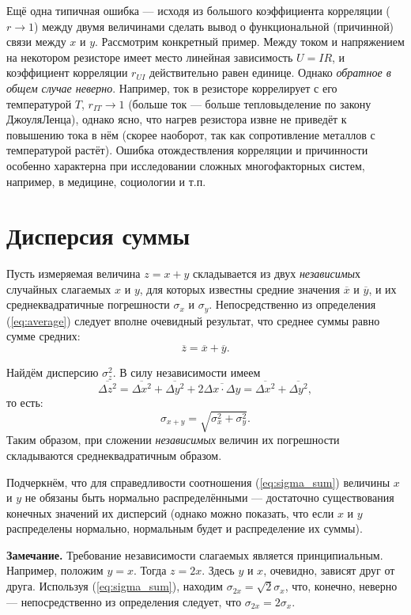 {\small{}Ещё одна типичная ошибка --- исходя из большого
коэффициента корреляции ($r\to1$) между двумя величинами сделать
вывод о функциональной (причинной) связи между $x$ и $y$. Рассмотрим
конкретный пример. Между током и напряжением на некотором резисторе
имеет место линейная зависимость $U=IR$, и коэффициент корреляции
$r_{UI}$ действительно равен единице. Однако }\emph{\small{}обратное
в общем случае неверно}{\small{}. Например, ток в резисторе коррелирует
с его температурой $T$, $r_{IT}\to1$ (больше ток --- больше
тепловыделение по закону Джоуля\textendash Ленца), однако ясно, что
нагрев резистора извне не приведёт к повышению тока в нём (скорее
наоборот, так как сопротивление металлов с температурой растёт). Ошибка
отождествления корреляции и причинности особенно характерна при исследовании
сложных многофакторных систем, например, в медицине, социологии и
т.п.}{\small\par}

\section{Дисперсия суммы}

Пусть измеряемая величина $z=x+y$ складывается из двух \emph{независимы}х
случайных слагаемых $x$ и $y$, для которых известны средние значения
$\overline{x}$ и $\overline{y}$, и их среднеквадратичные погрешности
$\sigma_{x}$ и $\sigma_{y}$. Непосредственно из определения (\ref{eq:average})
следует вполне очевидный результат, что среднее суммы равно сумме
средних: 
\[
\overline{z}=\overline{x}+\overline{y}.
\]

Найдём дисперсию $\sigma_{z}^{2}$. В силу независимости имеем
\[
\overline{\Delta z^{2}}=\overline{\Delta x^{2}}+\overline{\Delta y^{2}}+2\overline{\Delta x\cdot\Delta y}=\overline{\Delta x^{2}}+\overline{\Delta y^{2}},
\]
то есть:
\begin{equation}
\boxed{{\sigma_{x+y}=\sqrt{\sigma_{x}^{2}+\sigma_{y}^{2}}}}.\label{eq:sigma_sum}
\end{equation}
Таким образом, при сложении \emph{независимых }величин их погрешности
складываются среднеквадратичным образом.

Подчеркнём, что для справедливости соотношения (\ref{eq:sigma_sum})
величины $x$ и $y$ не обязаны быть нормально распределёнными ---
достаточно существования конечных значений их дисперсий (однако можно
показать, что если $x$ и $y$ распределены нормально, нормальным
будет и распределение их суммы).

\small{
\textbf{Замечание.} Требование независимости
слагаемых является принципиальным. Например, положим $y=x$. Тогда
$z=2x$. Здесь $y$ и $x$, очевидно, зависят друг от друга. Используя
(\ref{eq:sigma_sum}), находим $\sigma_{2x}=\sqrt{2}\sigma_{x}$,
что, конечно, неверно --- непосредственно из определения
следует, что $\sigma_{2x}=2\sigma_{x}$.
}

